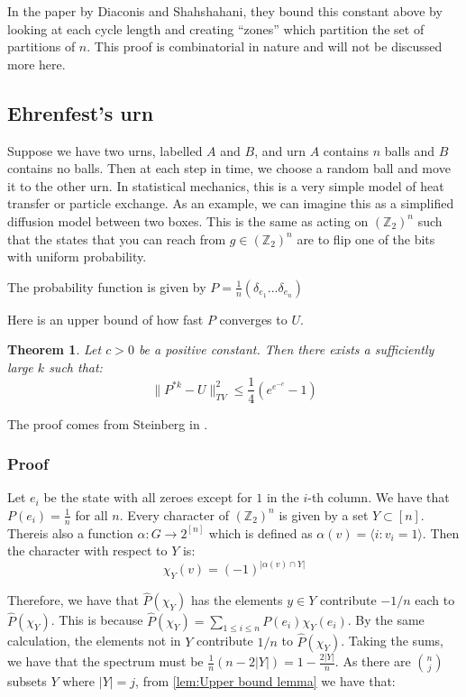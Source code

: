 \documentclass[]{article}
\newtheorem{theorem}{Theorem}
\theoremstyle{definition}
\numberwithin{theorem}{section}
\numberwithin{equation}{section}
\begin{document}
In the paper by Diaconis and Shahshahani\cite{diaconisGeneratingRandomPermutation1981}, they bound this constant above by looking at each cycle length and creating ``zones'' which partition the set of partitions of $n$. This proof is combinatorial in nature and will not be discussed more here. 
\subsection{Ehrenfest's urn}
Suppose we have two urns, labelled $A$ and $B$, and urn $A$ contains $n$ balls and $B$ contains no balls. Then at each step in time, we choose a random ball and move it to the other urn. In statistical mechanics, this is a very simple model of heat transfer or particle exchange. As an example, we can imagine this as a simplified diffusion model between two boxes. This is the same as acting on $(\mathbb{Z}_2)^n$ such that the states that you can reach from $g \in (\mathbb{Z}_2)^n$ are to flip one of the bits with uniform probability. 

The probability function is given by $P = \frac{1}{n} \left(\delta_{e_1} ... \delta_{e_n}\right)$

Here is an upper bound of how fast $P$ converges to $U$. 
\begin{theorem}
	Let $c > 0$ be a positive constant. Then there exists a sufficiently large $k$ such that:
	\begin{equation}
		\|P^{\ast k} - U\|^2_{TV} \leq \frac{1}{4} (e^{e^{-c}} - 1)
	\end{equation}
\end{theorem}
The proof comes from Steinberg in \cite{steinbergProbabilityRandomWalks2012}. 

\subsubsection{Proof}
Let $e_i$ be the state with all zeroes except for $1$ in the $i$-th column. We have that $P(e_i) = \frac{1}{n}$ for all $n$. 
Every character of $\left(\mathbb{Z}_2\right)^n$ is given by a set $Y \subset [n]$. Thereis also a function $\alpha: G \rightarrow 2^{[n]}$ which is defined as $\alpha(v) = \langle i : v_i = 1 \rangle$. Then the character with respect to $Y$ is:
\begin{equation}
	\chi_Y(v) = (-1)^{|\alpha(v) \cap Y|}
\end{equation}

Therefore, we have that $\widehat{P}(\chi_Y)$ has the elements $y \in Y$ contribute $ -1/n$ each to $\widehat{P}(\chi_Y)$. This is because $\widehat{P}(\chi_Y) = \sum_{1 \leq i \leq n} P(e_i) \chi_Y(e_i)$. By the same calculation, the elements not in $Y$ contribute $1/n$ to $\widehat{P}(\chi_Y)$. Taking the sums, we have that the spectrum must be $\frac{1}{n}(n - 2 |Y|) = 1 - \frac{2|Y|}{n}$. As there are $\binom{n}{j}$ subsets $Y$ where $|Y| = j$,
from \cref{lem:Upper bound lemma} we have that:
\end{document}
